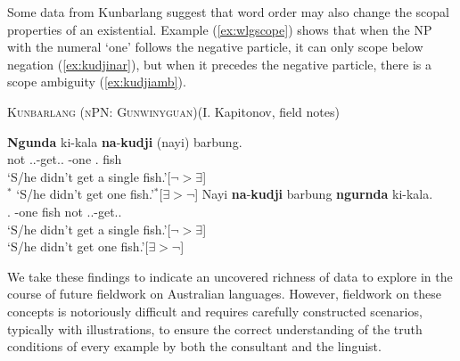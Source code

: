 \documentclass[12pt,egregdoesnotlikesansseriftitles]{scrartcl}
\begin{document}
Some data from Kunbarlang  suggest that word  order may also change the scopal properties of an existential. Example (\ref{ex:wlgscope}) shows that when the NP with the numeral `one' follows the negative particle, it can only scope below negation (\ref{ex:kudjinar}), but when it precedes the negative particle, there is a scope ambiguity (\ref{ex:kudjiamb}).
\begin{exe}
  \ex\label{ex:wlgscope} \textsc{Kunbarlang (nPN: Gunwinyguan)}\hfill (I. Kapitonov, field notes) %
  \begin{xlist}
    \ex\label{ex:kudjinar} \gll \textbf{Ngunda} ki-kala \textbf{na}-\textbf{kudji} (nayi) barbung.\\
    not \Tsg.\Irr.\Pst-get.\Irr.\Pst{} \Cli-one \phantom{(}\Nm.\Cli{} fish\\
    \glt `S/he didn't get a single fish.'\hfill [$\neg > \exists$]\\
    $^*$ `S/he didn't get one fish.'\hfill $^*$[$\exists > \neg$]
    \ex\label{ex:kudjiamb} \gll Nayi \textbf{na}-\textbf{kudji} barbung \textbf{ngurnda} ki-kala.\\
    \Nm.\Cli{} \Cli-one fish not \Tsg.\Irr.\Pst-get.\Irr.\Pst\\
    \glt `S/he didn't get a single fish.'\hfill [$\neg > \exists$]\\
    `S/he didn't get one fish.'\hfill [$\exists > \neg$]
  \end{xlist}
\end{exe}


We take these findings to indicate an uncovered richness of data to explore in the course of future fieldwork on Australian languages. However, fieldwork on these concepts is notoriously difficult and requires carefully constructed scenarios, typically with illustrations, to ensure the correct understanding of the truth conditions of every example by both the consultant and the linguist.
\end{document}
